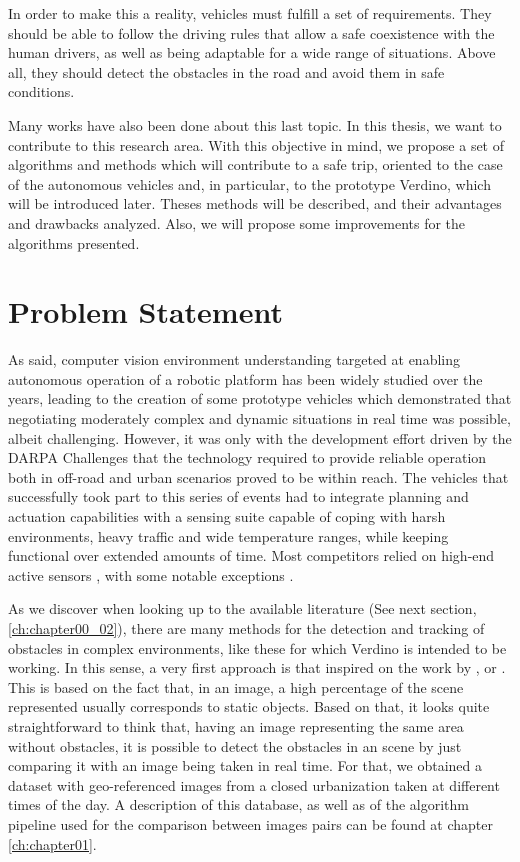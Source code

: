 In order to make this a reality, vehicles must fulfill a set of requirements. They should be able to follow the driving rules that allow a safe coexistence with the human drivers, as well as being adaptable for a wide range of situations. Above all, they should detect the obstacles in the road and avoid them in safe conditions. 

Many works have also been done about this last topic. In this thesis, we want to contribute to this research area. With this objective in mind, we propose a set of algorithms and methods which will contribute to a safe trip, oriented to the case of the autonomous vehicles and, in particular, to the prototype Verdino, which will be introduced later. Theses methods will be described, and their advantages and drawbacks analyzed. Also, we will propose some improvements for the algorithms presented.

\section{Problem Statement}\label{ch:chapter00_01}

As said, computer vision environment understanding targeted at enabling autonomous operation of a robotic platform has been widely studied over the years, leading to the creation of some prototype vehicles \citep{Maurer1996,Pomerleau1996,Broggi1999} which demonstrated that negotiating moderately complex and dynamic situations in real time was possible, albeit challenging. However, it was only with the development effort driven by the DARPA Challenges \citep{Buehler2007, Buehler2009} that the technology required to provide reliable operation both in off-road and urban scenarios proved to be within reach.
The vehicles that successfully took part to this series of events had to integrate planning and actuation capabilities with a sensing suite capable of coping with harsh environments, heavy traffic and wide temperature ranges, while keeping functional over extended amounts of time. Most competitors relied on high-end active sensors \citep{Urmson2008, Montemerlo2008, Bacha2008, Kammel2008}, with some notable exceptions \citep{Broggi2006, Broggi2010}. 

As we discover when looking up to the available literature (See next section, \ref{ch:chapter00_02}), there are many methods for the detection and tracking of obstacles in complex environments, like these for which Verdino is intended to be working. In this sense, a very first approach is that inspired on the work by \cite{primdahl2005change},  \cite{diego2011video} or \cite{vallespi2012prior}. This is based on the fact that, in an image, a high percentage of the scene represented usually corresponds to static objects. Based on that, it looks quite straightforward to think that, having an image representing the same area without obstacles, it is possible to detect the obstacles in an scene by just comparing it with an image being taken in real time. For that, we obtained a dataset with geo-referenced images from a closed urbanization taken at different times of the day. A description of this database, as well as of the algorithm pipeline used for the comparison between images pairs can be found at chapter \ref{ch:chapter01}.

